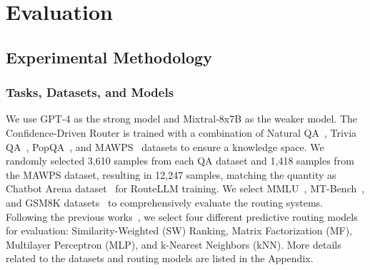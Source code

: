 \section{Evaluation}
\subsection{Experimental Methodology}
\subsubsection{Tasks, Datasets, and Models}
We use GPT-4 as the strong model and Mixtral-8x7B as the weaker model.
The Confidence-Driven Router is trained with a combination of Natural QA~\cite{Kwiatkowski, lee-etal-2019-latent}, Trivia QA~\cite{2017arXivtriviaqa}, PopQA~\cite{mallen2023llm_memorization}, and MAWPS~\cite{KoncelKedziorski2016MAWPSAM} datasets to ensure a knowledge space. We randomly selected 3,610 samples from each QA dataset and 1,418 samples from the MAWPS dataset, resulting in 12,247 samples, matching the quantity as Chatbot Arena dataset~\cite{chiang2024chatbot} for RouteLLM training. We select MMLU~\cite{Hendrycks2020MeasuringMM}, MT-Bench~\cite{Zheng2023JudgingLW}, and GSM8K datasets~\cite{Cobbe2021TrainingVT} to comprehensively evaluate the routing systems. Following the previous works~\cite{Ong2024RouteLLMLT, Stripelis2024TensorOperaRA}, we select four different predictive routing models for evaluation: Similarity-Weighted (SW) Ranking, Matrix Factorization (MF), Multilayer Perceptron (MLP), and k-Nearest Neighbors (kNN).
%
More details related to the datasets and routing models are listed in the Appendix.


